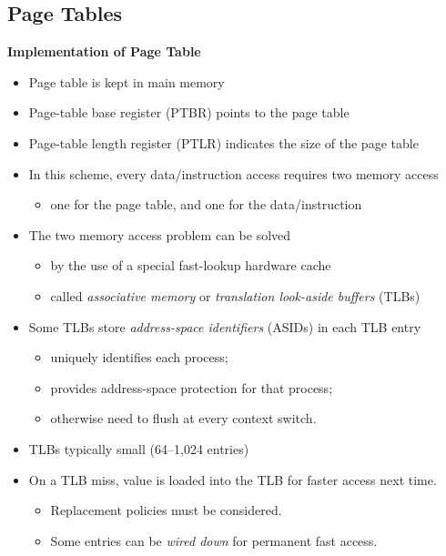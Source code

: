 \documentclass[11pt,a4paper]{article}
\begin{document}
\subsection{Page Tables}

\textbf{Implementation of Page Table}
\begin{itemize}
    \item Page table is kept in main memory
    \item Page-table base register (PTBR) points to the page table
    \item Page-table length register (PTLR) indicates the size of the page table
    \item In this scheme, every data/instruction access requires two memory access
        \begin{itemize}
            \item one for the page table, and one for the data/instruction
        \end{itemize}
    \item The two memory access problem can be solved
        \begin{itemize}
            \item by the use of a special fast-lookup hardware cache
            \item called \emph{associative memory} or \emph{translation look-aside buffers}
                (TLBs)
        \end{itemize}
    \item Some TLBs store \emph{address-space identifiers} (ASIDs) in each TLB entry
        \begin{itemize}
            \item uniquely identifies each process;
            \item provides address-space protection for that process;
            \item otherwise need to flush at every context switch.
        \end{itemize}
    \item TLBs typically small (64--1,024 entries)
    \item On a TLB miss, value is loaded into the TLB for faster access next time.
        \begin{itemize}
            \item Replacement policies must be considered.
            \item Some entries can be \emph{wired down} for permanent fast access.
        \end{itemize}
\end{itemize}
\end{document}
